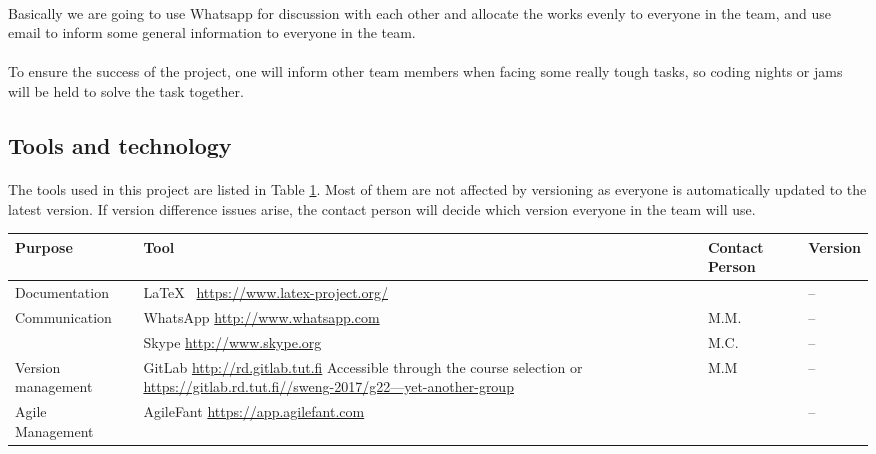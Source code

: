 \paragraph{} Basically we are going to use Whatsapp for discussion with each other and allocate the works evenly to everyone in the team, and use email to inform some general information to everyone in the team.

\paragraph{} To ensure the success of the project, one will inform other team members when facing some really tough tasks, so coding nights or jams will be held to solve the task together.

\subsection{Tools and technology}

\paragraph{} The tools used in this project are listed in Table \ref{table:tools}. Most of them are not affected by versioning as everyone is automatically updated to the latest version. If version difference issues arise, the contact person will decide which version everyone in the team will use.

\begin{table}[h]
\scriptsize
{}
\label{table:tools}
\begin{tabularx}{\textwidth}{|l|X|l|l|}
\hline
\rowcolor{Gray} \textbf{Purpose} & \textbf{Tool} & \textbf{Contact Person} & \textbf{Version} \\
\hline
Documentation & \LaTeX~ \href{https://www.latex-project.org/}{https://www.latex-project.org/} & & – \\
\hline
\multirow{2}{*}{Communication } & WhatsApp \href{http://www.whatsapp.com}{http://www.whatsapp.com} & M.M. & – \\
                                \cline{2-4}
                                & Skype \href{http://www.skype.org}{http://www.skype.org} & M.C. & – \\
\hline
Version management & GitLab \href{http://rd.gitlab.tut.fi}{http://rd.gitlab.tut.fi} \newline Accessible through the course selection or \href{https://gitlab.rd.tut.fi//sweng-2017/g22---yet-another-group}{https://gitlab.rd.tut.fi//sweng-2017/g22---yet-another-group} & M.M & – \\
\hline
Agile Management & AgileFant \href{https://app.agilefant.com}{https://app.agilefant.com} & & – \\
\hline
\end{tabularx}
\end{table}
